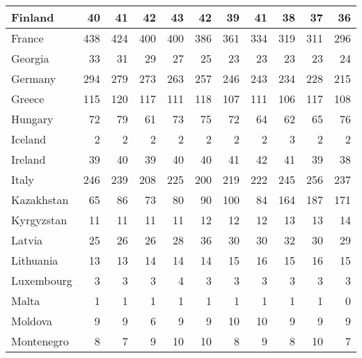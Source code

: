 \begin{table}
\begin{tabular}{|l|r|r|r|r|r|r|r|r|r|r|}
                       Finland&     40&     41&     42&     43&     42&     39&     41&     38&     37&     36\\\hline
                        France&    438&    424&    400&    400&    386&    361&    334&    319&    311&    296\\\hline
                       Georgia&     33&     31&     29&     27&     25&     23&     23&     23&     23&     24\\\hline
                       Germany&    294&    279&    273&    263&    257&    246&    243&    234&    228&    215\\\hline
                        Greece&    115&    120&    117&    111&    118&    107&    111&    106&    117&    108\\\hline
                       Hungary&     72&     79&     61&     73&     75&     72&     64&     62&     65&     76\\\hline
                       Iceland&      2&      2&      2&      2&      2&      2&      2&      3&      2&      2\\\hline
                       Ireland&     39&     40&     39&     40&     40&     41&     42&     41&     39&     38\\\hline
                         Italy&    246&    239&    208&    225&    200&    219&    222&    245&    256&    237\\\hline
                    Kazakhstan&     65&     86&     73&     80&     90&    100&     84&    164&    187&    171\\\hline
                    Kyrgyzstan&     11&     11&     11&     11&     12&     12&     12&     13&     13&     14\\\hline
                        Latvia&     25&     26&     26&     28&     36&     30&     30&     32&     30&     29\\\hline
                     Lithuania&     13&     13&     14&     14&     14&     15&     16&     15&     16&     15\\\hline
                    Luxembourg&      3&      3&      3&      4&      3&      3&      3&      3&      3&      3\\\hline
                         Malta&      1&      1&      1&      1&      1&      1&      1&      1&      1&      0\\\hline
                       Moldova&      9&      9&      6&      9&      9&     10&     10&      9&      9&      9\\\hline
                    Montenegro&      8&      7&      9&     10&     10&      8&      9&      8&     10&      7\\\hline

\end{tabular}
\end{table}
